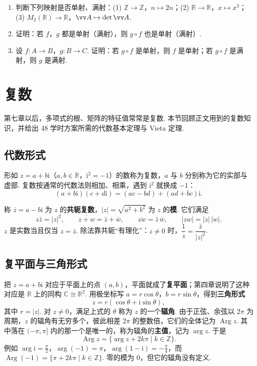 \begin{exercise}\label{exo:prelim-map}
	\begin{enumerate}
		\item 判断下列映射是否单射、满射：(1) $\mathbb{Z}\to\mathbb{Z}$，$n\mapsto2n$；(2) $\mathbb{R}\to\mathbb{R}$，$x\mapsto x^3$；(3) $M_2(\mathbb{R})\to\mathbb{R}$，$\vv A\mapsto\det\vv A$.
		\item 证明：若 $f$，$g$ 都是单射（满射），则 $g\circ f$ 也是单射（满射）.
		\item 设 $f:A\to B$，$g:B\to C$. 证明：若 $g\circ f$ 是单射，则 $f$ 是单射；若 $g\circ f$ 是满射，则 $g$ 是满射.
	\end{enumerate}
\end{exercise}

\section{复数}\label{app:complex}

第七章以后，多项式的根、矩阵的特征值常常是复数. 本节回顾正文用到的复数知识，并给出 48 学时方案所需的代数基本定理与 Vieta 定理.

\subsection{代数形式}

形如 $z=a+b\mathrm i$（$a,b\in\mathbb{R}$，$\mathrm i^2=-1$）的数称为复数，$a$ 与 $b$ 分别称为它的实部与虚部. 复数按通常的代数法则相加、相乘，遇到 $\mathrm i^2$ 就换成 $-1$：
\[(a+b\mathrm i)(c+d\mathrm i)=(ac-bd)+(ad+bc)\mathrm i.\]

称 $\bar z=a-b\mathrm i$ 为 $z$ 的\textbf{共轭复数}，$|z|=\sqrt{a^2+b^2}$ 为 $z$ 的\textbf{模}. 它们满足
\[z\bar z=|z|^2,\qquad \overline{z+w}=\bar z+\bar w,\qquad \overline{zw}=\bar z\,\bar w,\qquad |zw|=|z|\,|w|.\]
$z$ 是实数当且仅当 $z=\bar z$. 除法靠共轭“有理化”：$z\ne0$ 时，$\dfrac1z=\dfrac{\bar z}{|z|^2}$.

\subsection{复平面与三角形式}

把 $z=a+b\mathrm i$ 对应于平面上的点 $(a,b)$，平面就成了\textbf{复平面}；第四章说明了这种对应是 $\mathbb{R}$ 上的同构 $\mathbb{C}\cong\mathbb{R}^2$. 用极坐标写 $a=r\cos\theta$，$b=r\sin\theta$，得到\textbf{三角形式}
\[z=r(\cos\theta+\mathrm i\sin\theta),\]
其中 $r=|z|$. 对 $z\ne0$，满足上式的 $\theta$ 称为 $z$ 的一个\textbf{辐角}. 由于正弦、余弦以 $2\pi$ 为周期，$z$ 的辐角有无穷多个，彼此相差 $2\pi$ 的整数倍，它们的全体记为 $\operatorname{Arg}z$. 其中落在 $(-\pi,\pi]$ 内的那一个是唯一的，称为辐角的\textbf{主值}，记为 $\arg z$. 于是
\[\operatorname{Arg}z=\{\arg z+2k\pi\mid k\in\mathbb{Z}\}.\]
例如 $\arg\mathrm i=\frac\pi2$，$\arg(-1)=\pi$，$\arg(1-\mathrm i)=-\frac\pi4$，而 $\operatorname{Arg}(-1)=\{\pi+2k\pi\mid k\in\mathbb{Z}\}$. 零的模为 $0$，但它的辐角没有定义.

